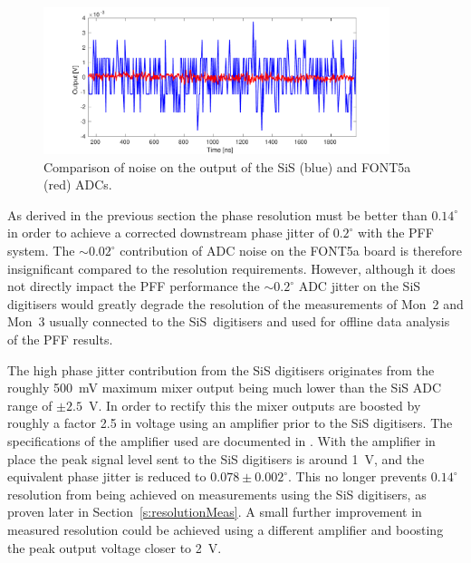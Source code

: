 \begin{figure}
  \centering
  \includegraphics[width=0.9\textwidth]{Figures/phaseMons/digitiserNosie}
  \caption{Comparison of noise on the output of the SiS (blue) and FONT5a (red) ADCs.}
  \label{f:digitiserNosie}
\end{figure}

As derived in the previous section the phase resolution must be better than \(0.14^\circ\) in order to achieve a corrected downstream phase jitter of \(0.2^\circ\) with the PFF system. The \(\sim0.02^\circ\) contribution of ADC noise on the FONT5a board is therefore insignificant compared to the resolution requirements. However, although it does not directly impact the PFF performance the \(\sim0.2^\circ\) ADC jitter on the SiS digitisers would greatly degrade the resolution of the measurements of Mon~2 and Mon~3 usually connected to the SiS~digitisers and used for offline data analysis of the PFF results. 

The high phase jitter contribution from the SiS digitisers originates from the roughly 500~mV maximum mixer output being much lower than the SiS ADC range of \(\pm2.5\)~V. In order to rectify this the mixer outputs are boosted by roughly a factor 2.5 in voltage using an amplifier prior to the SiS digitisers. The specifications of the amplifier used are documented in \cite{ampSiS}. With the amplifier in place the peak signal level sent to the SiS digitisers is around 1~V, and the equivalent phase jitter is reduced to \(0.078\pm0.002^\circ\). This no longer prevents \(0.14^\circ\) resolution from being achieved on measurements using the SiS digitisers, as proven later in Section~\ref{s:resolutionMeas}. A small further improvement in measured resolution could be achieved using a different amplifier and boosting the peak output voltage closer to 2~V.

